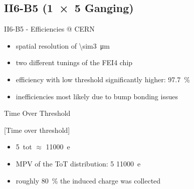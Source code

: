 \subsection{II6-B5 (\SI{1x5}{} Ganging)}
\begin{frame}{II6-B5 - Efficiencies @ CERN}

	
	\begin{itemize}\itemfill
		\item spatial resolution of \SI{\sim3}{\micro\meter}
		\item two different tunings of the FEI4 chip
		\item efficiency with low threshold significantly higher: \SI{97.7}{\%}
		\item inefficiencies most likely due to bump bonding issues
	\end{itemize}
	
\end{frame}
\begin{frame}{Time Over Threshold}

	[Time over threshold]	
	
	\begin{itemize}\itemfill
		\item \SI{5}{tot} $\approx$ \SI{11000}{e}
		\item MPV of the ToT distribution: 5 \ra \SI{11000}{e}
		\item roughly \SI{80}{\%} the induced charge was collected
	\end{itemize}
	
\end{frame}
